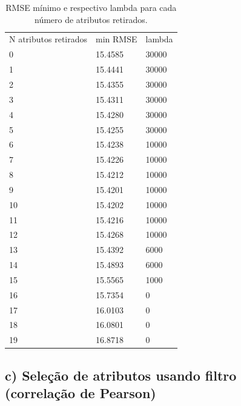 \documentclass[a4paper, 12pt]{article}
\begin{document}
\begin{table}[]
    \centering
    \caption{RMSE mínimo e respectivo lambda para cada número de atributos retirados.}
\begin{tabular}{lll}
N atributos retirados & min RMSE & lambda \\
0                     & 15.4585 & 30000 \\
1                     & 15.4441 & 30000 \\
2                     & 15.4355 & 30000 \\
3                     & 15.4311 & 30000 \\
4                     & 15.4280 & 30000 \\
5                     & 15.4255 & 30000 \\
6                     & 15.4238 & 10000 \\
7                     & 15.4226 & 10000 \\
8                     & 15.4212 & 10000 \\
9                     & 15.4201 & 10000 \\
10                    & 15.4202 & 10000 \\
11                    & 15.4216 & 10000 \\
12                    & 15.4268 & 10000 \\
13                    & 15.4392 & 6000  \\
14                    & 15.4893 & 6000  \\
15                    & 15.5565 & 1000  \\
16                    & 15.7354 & 0     \\
17                    & 16.0103 & 0     \\
18                    & 16.0801 & 0     \\
19                    & 16.8718 & 0
\end{tabular}
\end{table}


\subsection*{c) Seleção de atributos usando filtro (correlação de Pearson)}
\end{document}
